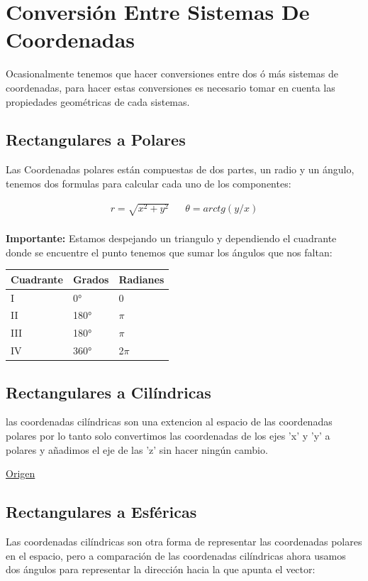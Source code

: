 \documentclass{article}
\begin{document}
\section{Conversión Entre Sistemas De Coordenadas}
\label{sec:org20f2edf}
Ocasionalmente tenemos que hacer conversiones entre dos ó más sistemas de coordenadas, para hacer estas conversiones es necesario tomar en cuenta las propiedades geométricas de cada sistemas.

\subsection{Rectangulares a Polares}
\label{sec:orgb7ba184}
Las Coordenadas polares están compuestas de dos partes, un radio y un ángulo, tenemos dos formulas para calcular cada uno de los componentes: 

\[\begin{aligned}
 r = \sqrt{x^2+y^2} && \theta = arctg\left(y/x\right) \\
\end{aligned}\] 

\textbf{Importante:} Estamos despejando un triangulo y dependiendo el cuadrante donde se encuentre el punto tenemos que sumar los ángulos que nos faltan: 

\begin{center}
\label{tab:org93b8981}
\begin{tabular}{lll}
Cuadrante & Grados & Radianes\\
\hline
I & 0° & 0\\
II & 180° & \(\pi\)\\
III & 180° & \(\pi\)\\
IV & 360° & 2\(\pi\)\\
\end{tabular}
\end{center}

\subsection{Rectangulares a Cilíndricas}
\label{sec:orgb60cfbb}
las coordenadas cilíndricas son una extencion al espacio de las coordenadas polares por lo tanto solo convertimos las coordenadas de los ejes 'x' y 'y' a polares y añadimos el eje de las 'z' sin hacer ningún cambio.

\href{http://www.learningaboutelectronics.com/Articulos/Calculadora-de-conversion-de-coordenadas-cartesianas-a-cilindricas.php}{Origen}

\subsection{Rectangulares a Esféricas}
\label{sec:orgbd9c739}
Las coordenadas cilíndricas son otra forma de representar las coordenadas polares en el espacio, pero a comparación de las coordenadas cilíndricas ahora usamos dos ángulos para representar la dirección hacia la que apunta el vector: 
\end{document}
